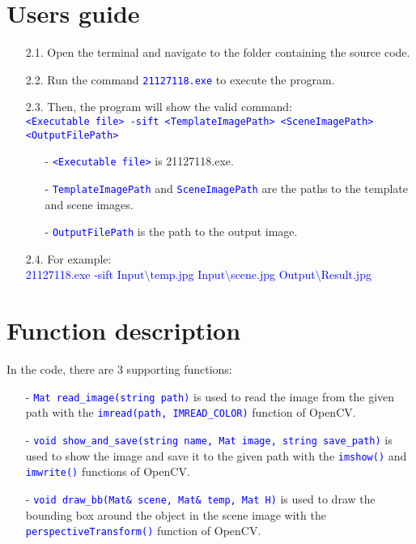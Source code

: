 \documentclass{report}
\begin{document}
\section{Users guide}
\begin{itemize}
  \item[2.1.] Open the terminal and navigate to the folder containing the source code.
  \item[2.2.] Run the command \textcolor{blue}{\lstinline|21127118.exe|} to execute the program.
  \item[2.3.] Then, the program will show the valid command: \\ \textcolor{blue}{\lstinline|<Executable file> -sift <TemplateImagePath> <SceneImagePath> <OutputFilePath>|}
  \begin{itemize}
    \item[-] \textcolor{blue}{\lstinline|<Executable file>|} is 21127118.exe.
    \item[-] \textcolor{blue}{\lstinline|TemplateImagePath|} and \textcolor{blue}{\lstinline|SceneImagePath|} are the paths to the template and scene images.
    \item[-] \textcolor{blue}{\lstinline|OutputFilePath|} is the path to the output image.
  \end{itemize}
  \item[2.4.] For example: \\ \textcolor{blue}{21127118.exe -sift Input$\setminus$temp.jpg Input$\setminus$scene.jpg Output$\setminus$Result.jpg}
\end{itemize}


\section{Function description}
In the code, there are 3 supporting functions: 

\begin{itemize}
  \item[-] \textcolor{blue}{\lstinline|Mat read_image(string path)|} is used to read the image from the given path with the \textcolor{blue}{\lstinline|imread(path, IMREAD_COLOR)|} function of OpenCV.
  \item[-] \textcolor{blue}{\lstinline|void show_and_save(string name, Mat image, string save_path)|} is used to show the image and save it to the given path with the \textcolor{blue}{\lstinline|imshow()|} and \textcolor{blue}{\lstinline|imwrite()|} functions of OpenCV.
  \item[-] \textcolor{blue}{\lstinline|void draw_bb(Mat& scene, Mat& temp, Mat H)|} is used to draw the bounding box around the object in the scene image with the \textcolor{blue}{\lstinline|perspectiveTransform()|} function of OpenCV.
\end{itemize}
\end{document}
